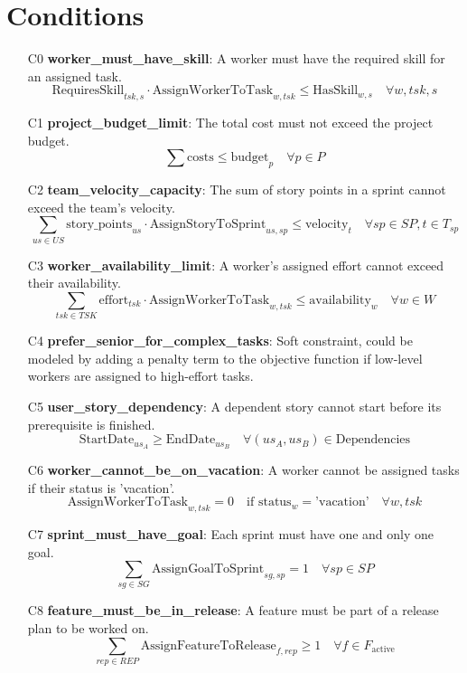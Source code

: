 \documentclass{article}
\begin{document}
\section{Conditions}
\begin{itemize}
    \item[C0] \textbf{worker\_must\_have\_skill}: A worker must have the required skill for an assigned task.
    \[ \text{RequiresSkill}_{tsk, s} \cdot \text{AssignWorkerToTask}_{w, tsk} \le \text{HasSkill}_{w, s} \quad \forall w, tsk, s \]
    \item[C1] \textbf{project\_budget\_limit}: The total cost must not exceed the project budget.
    \[ \sum \text{costs} \le \text{budget}_p \quad \forall p \in P \]
    \item[C2] \textbf{team\_velocity\_capacity}: The sum of story points in a sprint cannot exceed the team's velocity.
    \[ \sum_{us \in US} \text{story\_points}_{us} \cdot \text{AssignStoryToSprint}_{us, sp} \le \text{velocity}_t \quad \forall sp \in SP, t \in T_{sp} \]
    \item[C3] \textbf{worker\_availability\_limit}: A worker's assigned effort cannot exceed their availability.
    \[ \sum_{tsk \in TSK} \text{effort}_{tsk} \cdot \text{AssignWorkerToTask}_{w, tsk} \le \text{availability}_w \quad \forall w \in W \]
    \item[C4] \textbf{prefer\_senior\_for\_complex\_tasks}: Soft constraint, could be modeled by adding a penalty term to the objective function if low-level workers are assigned to high-effort tasks.
    \item[C5] \textbf{user\_story\_dependency}: A dependent story cannot start before its prerequisite is finished.
    \[ \text{StartDate}_{us_A} \ge \text{EndDate}_{us_B} \quad \forall (us_A, us_B) \in \text{Dependencies} \]
    \item[C6] \textbf{worker\_cannot\_be\_on\_vacation}: A worker cannot be assigned tasks if their status is 'vacation'.
    \[ \text{AssignWorkerToTask}_{w, tsk} = 0 \quad \text{if } \text{status}_w = \text{'vacation'} \quad \forall w, tsk \]
    \item[C7] \textbf{sprint\_must\_have\_goal}: Each sprint must have one and only one goal.
    \[ \sum_{sg \in SG} \text{AssignGoalToSprint}_{sg, sp} = 1 \quad \forall sp \in SP \]
    \item[C8] \textbf{feature\_must\_be\_in\_release}: A feature must be part of a release plan to be worked on.
    \[ \sum_{rep \in REP} \text{AssignFeatureToRelease}_{f, rep} \ge 1 \quad \forall f \in F_{\text{active}} \]
\end{itemize}
\end{document}
